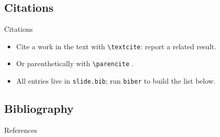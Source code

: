 \documentclass[aspectratio=43,11pt]{beamer}
\begin{document}
\subsection{Citations}
\begin{frame}{Citations}
  \begin{itemize}
    \item Cite a work in the text with \texttt{\textbackslash textcite}:
          \textcite{example2021} report a related result.
    \item Or parenthetically with \texttt{\textbackslash parencite}
          \parencite{example2019, examplebook2018}.
    \item All entries live in \texttt{slide.bib}; run \texttt{biber} to build
          the list below.
  \end{itemize}
\end{frame}

\subsection{Bibliography}
\begin{frame}[allowframebreaks]{References}
  \footnotesize
  \nocite{*}%
  \setlength{\leftskip}{1.5em}%
  \printbibliography[heading=none]
\end{frame}
\end{document}
